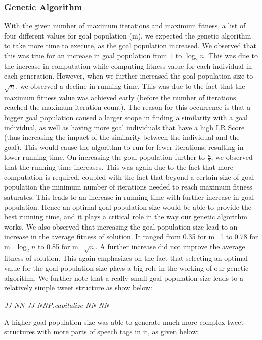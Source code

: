 \subsubsection{Genetic Algorithm}
With the given number of maximum iterations and maximum fitness, a list of four different values for goal population (m), we expected the genetic algorithm to take more time to execute, as the goal population increased. We observed that this was true for an increase in goal population from $1$ to $\log_2 n$. This was due to the increase in computation while computing fitness value for each individual in each generation. However, when we further increased the goal population size to $\sqrt{n}$, we observed a decline in running time. This was due to the fact that the maximum fitness value was achieved early (before the number of iterations reached the maximum iteration count). The reason for this occurrence is that a bigger goal population caused a larger scope in finding a similarity with a goal individual, as well as having more goal individuals that have a high LR Score (thus increasing the impact of the similarity between the individual and the goal). This would cause the algorithm to run for fewer iterations, resulting in lower running time. On increasing the goal population further to $\frac{n}{2}$, we observed that the running time increases. This was again due to the fact that more computation is required, coupled with the fact that beyond a certain size of goal population the minimum number of iterations needed to reach maximum fitness saturates. This leads to an increase in running time with further increase in goal population. Hence an optimal goal population size would be able to provide the best running time, and it plays a critical role in the way our genetic algorithm works. We also observed that increasing the goal population size lead to an increase in the average fitness of solution. It ranged from 0.35 for m=1 to 0.78 for m=$\log_2 {n}$ to 0.85 for m=$\sqrt n$. A further increase did not improve the average fitness of solution. This again emphasizes on the fact that selecting an optimal value for the goal population size plays a big role in the working of our genetic algorithm.
We further note that a really small goal population size leads to a relatively simple tweet structure as show below: 

    \textit{JJ NN JJ NNP.capitalize NN NN}

A higher goal population size was able to generate much more complex tweet structures with more parts of speech tags in it, as given below:

